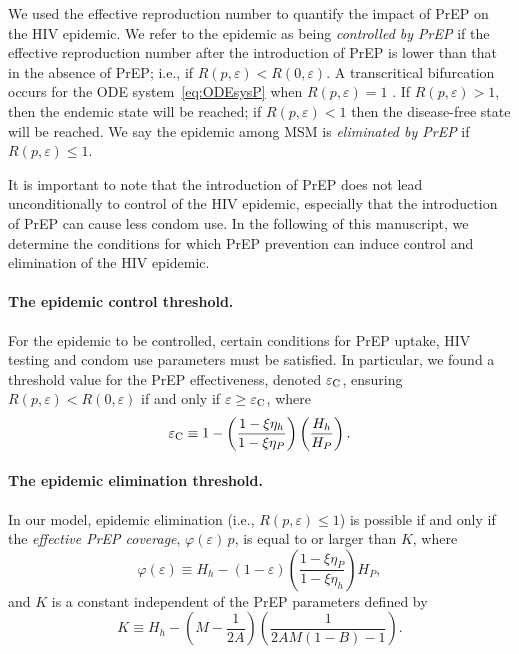 \documentclass[12pt]{article}
\begin{document}
We used the effective reproduction number to quantify the impact of PrEP on the HIV epidemic. We refer to the epidemic as being \textit{controlled by PrEP} if the effective reproduction number after the introduction of PrEP is lower than that in the absence of PrEP; i.e., if $R(p,\varepsilon) < R(0,\varepsilon)$. A transcritical bifurcation occurs for the ODE system~\eqref{eq:ODEsysP} when $R(p,\varepsilon)=1$ \cite{Jacquez1988,VanDenDriessche2008}. If $R(p,\varepsilon)>1$, then the endemic state will be reached; if $R(p,\varepsilon) < 1$ then the disease-free state will be reached. We say the epidemic among MSM is \textit{eliminated by PrEP} if $R(p,\varepsilon) \leq 1$. 

It is important to note that the introduction of PrEP does not lead unconditionally to control of the HIV epidemic, especially that the introduction of PrEP can cause less condom use. In the following of this manuscript, we determine the conditions for which PrEP prevention can induce control and elimination of the HIV epidemic.


\paragraph{The epidemic control threshold.} 

For the epidemic to be controlled, certain conditions for PrEP uptake, HIV testing and condom use parameters must be satisfied. In particular, we found a threshold value for the PrEP effectiveness, denoted $\varepsilon_{\rm C}$, ensuring $R(p,\varepsilon) < R(0,\varepsilon)$ if and only if $\varepsilon \geq \varepsilon_{\rm C}$, where
\begin{equation}
	\varepsilon_{\rm C}\equiv 1 - \left( \frac{1-\xi \eta_h}{1-\xi \eta_P}\right) \left(\frac{H_h}{H_P}\right).
\end{equation}


\paragraph{The epidemic elimination threshold.} 

In our model, epidemic elimination (i.e., $R(p,\varepsilon) \leq 1$) is possible if and only if the \textit{effective PrEP coverage}, $\varphi(\varepsilon) \, p$, is equal to or larger than $K$, where 
\begin{equation}
	\varphi(\varepsilon) \equiv H_h - (1-\varepsilon) \left( \frac{1-\xi \eta_P}{1-\xi \eta_h}\right) H_P,
\end{equation} 
and $K$ is a constant independent of the PrEP parameters defined by
\begin{equation}
	K \equiv H_h - \left(M - \frac{1}{2A}\right) \left(\frac{1}{2AM (1-B) -1}\right).
\end{equation}
\end{document}
